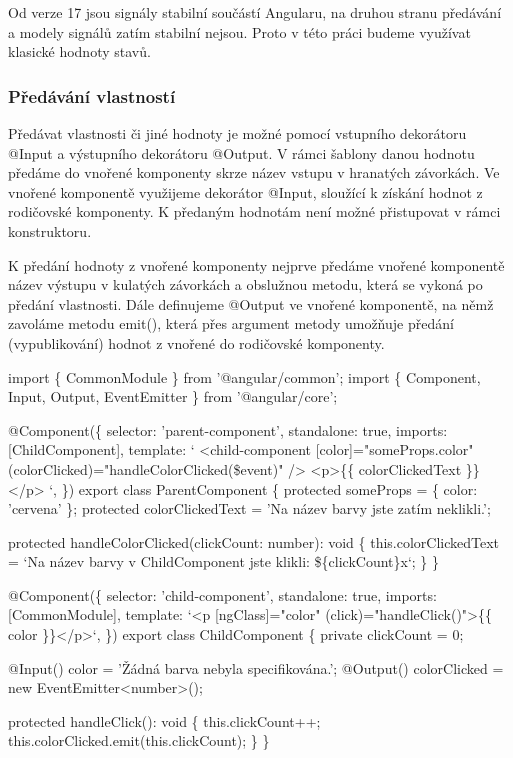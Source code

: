 Od verze 17 jsou signály stabilní součástí Angularu, na druhou stranu předávání a modely signálů zatím stabilní nejsou. 
Proto v této práci budeme využívat klasické hodnoty stavů.\cite{angulardev}

\subsubsection{Předávání vlastností}

Předávat vlastnosti či jiné hodnoty je možné pomocí vstupního dekorátoru @Input a výstupního dekorátoru @Output. 
V rámci šablony danou hodnotu předáme do vnořené komponenty skrze název vstupu v hranatých závorkách.   
Ve vnořené komponentě využijeme dekorátor @Input, sloužící k získání hodnot z rodičovské komponenty. K předaným hodnotám není možné přistupovat v rámci konstruktoru. 

K předání hodnoty z vnořené komponenty nejprve předáme vnořené komponentě název výstupu v kulatých závorkách a obslužnou metodu, která se vykoná po předání vlastnosti. 
Dále definujeme @Output ve vnořené komponentě, na němž zavoláme metodu emit(), která přes argument metody umožňuje předání (vypublikování) hodnot z vnořené do rodičovské komponenty.\cite{angulardev,learningangular}

\begin{prog}
import \{ CommonModule \} from '@angular/common';
import \{ Component, Input, Output, EventEmitter \} from '@angular/core';

@Component(\{
  selector: 'parent-component',
  standalone: true,
  imports: [ChildComponent],
  template: `
    <child-component 
      [color]="someProps.color" 
      (colorClicked)="handleColorClicked(\$event)" 
    />
    <p>\{\{ colorClickedText \}\}</p>
  `,
\})
export class ParentComponent \{
  protected someProps = \{ color: 'cervena' \};
  protected colorClickedText = 'Na název barvy jste zatím neklikli.';

  protected handleColorClicked(clickCount: number): void \{
    this.colorClickedText = `Na název barvy 
      v ChildComponent jste klikli: \$\{clickCount\}x`;
  \}
\}

@Component(\{
  selector: 'child-component',
  standalone: true,
  imports: [CommonModule],
  template: `<p [ngClass]="color" (click)="handleClick()">\{\{ color \}\}</p>`,
\})
export class ChildComponent \{
  private clickCount = 0;

  @Input() color = 'Žádná barva nebyla specifikována.';
  @Output() colorClicked = new EventEmitter<number>();

  protected handleClick(): void \{
    this.clickCount++;
    this.colorClicked.emit(this.clickCount);
  \}
\}
\end{prog}

